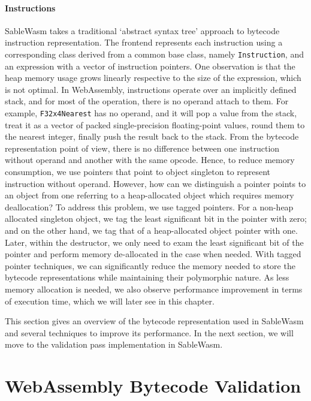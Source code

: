 \paragraph{Instructions}
SableWasm takes a traditional `abstract syntax tree' approach to bytecode instruction representation. The frontend represents each instruction using a corresponding class derived from a common base class, namely \texttt{Instruction}, and an expression with a vector of instruction pointers. One observation is that the heap memory usage grows linearly respective to the size of the expression, which is not optimal. In WebAssembly, instructions operate over an implicitly defined stack, and for most of the operation, there is no operand attach to them. For example, \texttt{F32x4Nearest} has no operand, and it will pop a value from the stack, treat it as a vector of packed single-precision floating-point values, round them to the nearest integer, finally push the result back to the stack. From the bytecode representation point of view, there is no difference between one instruction without operand and another with the same opcode. Hence, to reduce memory consumption, we use pointers that point to object singleton to represent instruction without operand. However, how can we distinguish a pointer points to an object from one referring to a heap-allocated object which requires memory deallocation? To address this problem, we use tagged pointers. For a non-heap allocated singleton object, we tag the least significant bit in the pointer with zero; and on the other hand, we tag that of a heap-allocated object pointer with one. Later, within the destructor, we only need to exam the least significant bit of the pointer and perform memory de-allocated in the case when needed. With tagged pointer techniques, we can significantly reduce the memory needed to store the bytecode representations while maintaining their polymorphic nature. As less memory allocation is needed, we also observe performance improvement in terms of execution time, which we will later see in this chapter.

This section gives an overview of the bytecode representation used in SableWasm and several techniques to improve its performance. In the next section, we will move to the validation pass implementation in SableWasm.

\section{WebAssembly Bytecode Validation}

